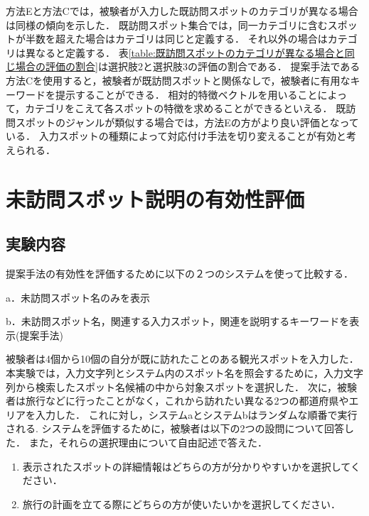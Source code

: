 \documentclass{deimj}
\begin{document}
方法Eと方法Cでは，被験者が入力した既訪問スポットのカテゴリが異なる場合は同様の傾向を示した．
既訪問スポット集合では，同一カテゴリに含むスポットが半数を超えた場合はカテゴリは同じと定義する．
それ以外の場合はカテゴリは異なると定義する．
表\ref{table:既訪問スポットのカテゴリが異なる場合と同じ場合の評価の割合}は選択肢2と選択肢3の評価の割合である．
提案手法である方法Cを使用すると，被験者が既訪問スポットと関係なしで，被験者に有用なキーワードを提示することができる．
相対的特徴ベクトルを用いることによって，カテゴリをこえて各スポットの特徴を求めることができるといえる．
既訪問スポットのジャンルが類似する場合では，方法Eの方がより良い評価となっている．
入力スポットの種類によって対応付け手法を切り変えることが有効と考えられる．


\section{未訪問スポット説明の有効性評価}
\label{sec:未訪問スポット説明の有効性評価}
\subsection{実験内容}
提案手法の有効性を評価するために以下の２つのシステムを使って比較する．
\begin{description}
  \item a．未訪問スポット名のみを表示
  \item b．未訪問スポット名，関連する入力スポット，関連を説明するキーワードを表示(提案手法)
\end{description}

被験者は4個から10個の自分が既に訪れたことのある観光スポットを入力した．
本実験では，入力文字列とシステム内のスポット名を照会するために，入力文字列から検索したスポット名候補の中から対象スポットを選択した．
次に，被験者は旅行などに行ったことがなく，これから訪れたい異なる2つの都道府県やエリアを入力した．
これに対し，システムaとシステムbはランダムな順番で実行される.
システムを評価するために，被験者は以下の2つの設問について回答した．
また，それらの選択理由について自由記述で答えた．
\begin{enumerate}
  \item 表示されたスポットの詳細情報はどちらの方が分かりやすいかを選択してください．
  \item 旅行の計画を立てる際にどちらの方が使いたいかを選択してください．
\end{enumerate}
\end{document}
